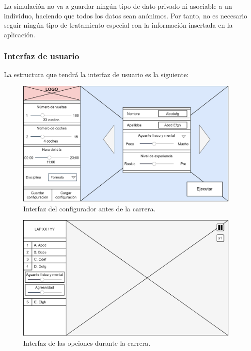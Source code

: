 La simulación no va a guardar ningún tipo de dato privado ni asociable a un individuo, haciendo que todos los datos sean anónimos. Por tanto, no es necesario seguir ningún tipo de tratamiento especial con la información insertada en la aplicación.

\subsubsection{Interfaz de usuario}

La estructura que tendrá la interfaz de usuario es la siguiente:

\begin{figure}[H]
    \centering
    \includegraphics[width=\textwidth]{imagenes/pag1.png}
    \caption{Interfaz del configurador antes de la carrera.}
 \end{figure}

 \begin{figure}[H]
    \centering
    \includegraphics[width=\textwidth]{imagenes/pag2.png}
    \caption{Interfaz de las opciones durante la carrera.}
 \end{figure}
